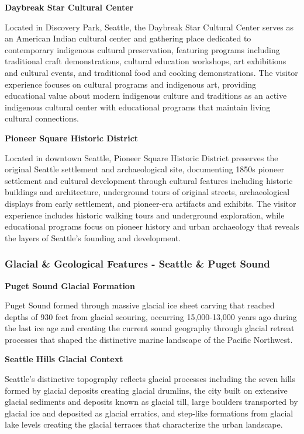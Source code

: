 \documentclass[
  11pt,
  letterpaper,
  DIV=10,
  numbers=noendperiod]{scrartcl}
\begin{document}
\textbf{Daybreak Star Cultural Center}

Located in Discovery Park, Seattle, the Daybreak Star Cultural Center
serves as an American Indian cultural center and gathering place
dedicated to contemporary indigenous cultural preservation, featuring
programs including traditional craft demonstrations, cultural education
workshops, art exhibitions and cultural events, and traditional food and
cooking demonstrations. The visitor experience focuses on cultural
programs and indigenous art, providing educational value about modern
indigenous culture and traditions as an active indigenous cultural
center with educational programs that maintain living cultural
connections.

\textbf{Pioneer Square Historic District}

Located in downtown Seattle, Pioneer Square Historic District preserves
the original Seattle settlement and archaeological site, documenting
1850s pioneer settlement and cultural development through cultural
features including historic buildings and architecture, underground
tours of original streets, archaeological displays from early
settlement, and pioneer-era artifacts and exhibits. The visitor
experience includes historic walking tours and underground exploration,
while educational programs focus on pioneer history and urban
archaeology that reveals the layers of Seattle's founding and
development.

\subsubsection{Glacial \& Geological Features - Seattle \& Puget
Sound}\label{glacial-geological-features---seattle-puget-sound}

\textbf{Puget Sound Glacial Formation}

Puget Sound formed through massive glacial ice sheet carving that
reached depths of 930 feet from glacial scouring, occurring
15,000-13,000 years ago during the last ice age and creating the current
sound geography through glacial retreat processes that shaped the
distinctive marine landscape of the Pacific Northwest.

\textbf{Seattle Hills Glacial Context}

Seattle's distinctive topography reflects glacial processes including
the seven hills formed by glacial deposits creating glacial drumlins,
the city built on extensive glacial sediments and deposits known as
glacial till, large boulders transported by glacial ice and deposited as
glacial erratics, and step-like formations from glacial lake levels
creating the glacial terraces that characterize the urban landscape.
\end{document}
